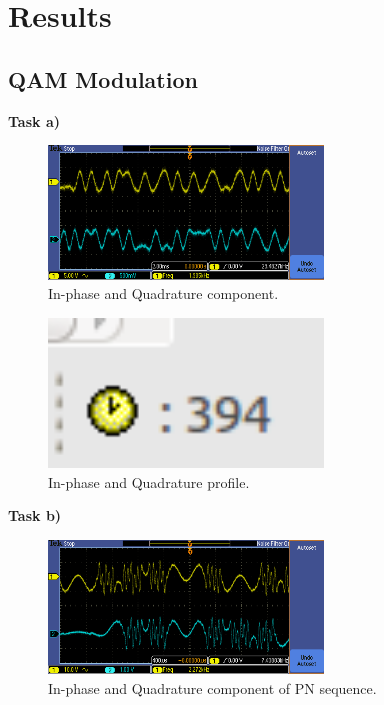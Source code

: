 \documentclass{article}
\begin{document}

\pagebreak
\section{Results}

\subsection{QAM Modulation}

\textbf{Task a)}
\begin{figure}[h]
  \begin{center}
    \includegraphics[width=0.65\textwidth]{img/task_a_oscilloscope.png}
    \caption{In-phase and Quadrature component.}
  \end{center}
\end{figure}

\begin{figure}[h]
  \begin{center}
    \includegraphics[width=0.65\textwidth]{img/task_a_profile.png}
    \caption{In-phase and Quadrature profile.}
  \end{center}
\end{figure}

\pagebreak
\textbf{Task b)}

\begin{figure}[h]
  \begin{center}
    \includegraphics[width=0.65\textwidth]{img/task_b_oscilloscope.png}
    \caption{In-phase and Quadrature component of PN sequence.}
  \end{center}
\end{figure}
\end{document}
